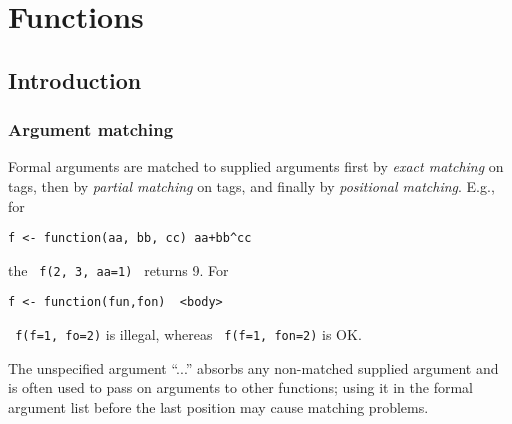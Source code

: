 
\chapter{Functions}
\label{chap:functions}

\section{Introduction}
\label{sec:introduction-1}

\subsection{Argument matching}
\label{sec:argument-matching-1}



Formal arguments are matched to supplied arguments first by
{\it exact matching} on tags, then by {\it partial matching} on tags,
and finally by {\it positional matching}. E.g., for 
\begin{lstlisting}
f <- function(aa, bb, cc) aa+bb^cc
\end{lstlisting}
the \lstinline! f(2, 3, aa=1) ! returns 9. For 
\begin{lstlisting}
f <- function(fun,fon)  <body>
\end{lstlisting}
\lstinline! f(f=1, fo=2)! is illegal, whereas
\lstinline! f(f=1, fon=2)! is OK.  

The unspecified argument ``...''  absorbs any non-matched supplied
argument and is often used to pass on arguments to other functions;
using it in the formal argument list before the last position may
cause matching problems.

